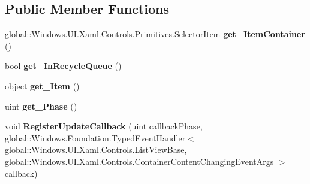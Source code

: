 \subsection*{Public Member Functions}
\begin{DoxyCompactItemize}
\item 
\mbox{\label{class_windows_1_1_u_i_1_1_xaml_1_1_controls_1_1_container_content_changing_event_args_a5fc601b8ea34400cac39f7c694925574}} 
global\+::\+Windows.\+U\+I.\+Xaml.\+Controls.\+Primitives.\+Selector\+Item {\bfseries get\+\_\+\+Item\+Container} ()
\item 
\mbox{\label{class_windows_1_1_u_i_1_1_xaml_1_1_controls_1_1_container_content_changing_event_args_aa88d1a956dccd408c22cd68822cbf018}} 
bool {\bfseries get\+\_\+\+In\+Recycle\+Queue} ()
\item 
\mbox{\label{class_windows_1_1_u_i_1_1_xaml_1_1_controls_1_1_container_content_changing_event_args_adf6a56892a3645903bdbeb798faa1e67}} 
object {\bfseries get\+\_\+\+Item} ()
\item 
\mbox{\label{class_windows_1_1_u_i_1_1_xaml_1_1_controls_1_1_container_content_changing_event_args_a83b5777887886032cce986dfbafd12ac}} 
uint {\bfseries get\+\_\+\+Phase} ()
\item 
\mbox{\label{class_windows_1_1_u_i_1_1_xaml_1_1_controls_1_1_container_content_changing_event_args_af9bbdca8851131ee69d2767595d51531}} 
void {\bfseries Register\+Update\+Callback} (uint callback\+Phase, global\+::\+Windows.\+Foundation.\+Typed\+Event\+Handler$<$ global\+::\+Windows.\+U\+I.\+Xaml.\+Controls.\+List\+View\+Base, global\+::\+Windows.\+U\+I.\+Xaml.\+Controls.\+Container\+Content\+Changing\+Event\+Args $>$ callback)
\item 
\mbox{\label{class_windows_1_1_u_i_1_1_xaml_1_1_controls_1_1_container_content_changing_event_args_a04e2ae3d4530956b6f2478107d6aca2a}} 

\end{DoxyCompactItemize}
